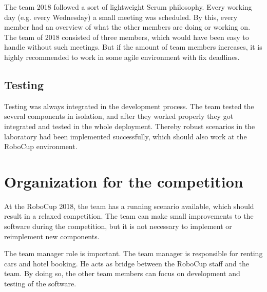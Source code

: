 The team 2018 followed a sort of lightweight Scrum philosophy. Every working day (e.g. every Wednesday) a small meeting was scheduled. By this, every member had an overview of what the other members are doing or working on. The team of 2018 consisted of three members, which would have been easy to handle without such meetings. But if the amount of team members increases, it is highly recommended to work in some agile environment with fix deadlines.

\subsection{Testing}

Testing was always integrated in the development process. The team tested the several components in isolation, and after they worked properly they got integrated and tested in the whole deployment. Thereby robust scenarios in the laboratory had been implemented successfully, which should also work at the RoboCup environment.


\section{Organization for the competition}

At the RoboCup 2018, the team has a running scenario available, which should result in a relaxed competition. The team can make small improvements to the software during the competition, but it is not necessary to implement or reimplement new components.

The team manager role is important. The team manager is responsible for renting cars and hotel booking. He acts as bridge between the RoboCup staff and the team. By doing so, the other team members can focus on development and testing of the software.
